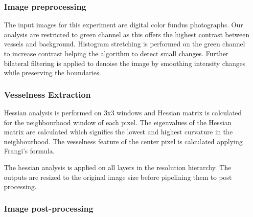 \documentclass[conference]{IEEEtran}
\begin{document}
\subsubsection{Image preprocessing}
\label{sssec:gpreprocess}
\par
The input images for this experiment are digital color fundus photographs. Our analysis are restricted to green channel as this offers the highest contrast between vessels and background. Histogram stretching is performed on the green channel to increase contrast helping the algorithm to detect small changes. Further bilateral filtering is applied to denoise the image by smoothing intensity changes while preserving the boundaries.


\subsubsection{Vesselness Extraction}
\label{sssec:vessel}

\par
Hessian analysis is performed on 3x3 windows and Hessian matrix is calculated for the neighbourhood window of each pixel. The eigenvalues of the Hessian matrix are calculated which signifies the lowest and highest curvature in the neighbourhood. The vesselness feature of the center pixel is calculated applying Frangi’s formula.
\par
The hessian analysis is applied on all layers in the resolution hierarchy. The outputs are resized to the original image size before pipelining them to post processing.

\subsubsection{Image post-processing}
\label{sssec:post}
\end{document}
